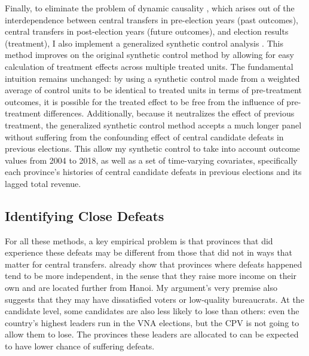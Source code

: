 \documentclass[12pt]{article}
\newcommand{\1}{\mathbbm{1}}
\begin{document}
Finally, to eliminate the problem of dynamic causality \citep{ImaiKim2019}, which arises out of the interdependence between central transfers in pre-election years (past outcomes), central transfers in post-election years (future outcomes), and election results (treatment), I also implement a generalized synthetic control analysis \citep{Xu2017gsynth}. This method improves on the original synthetic control method \citep{Abadie2010} by allowing for easy calculation of treatment effects across multiple treated units. The fundamental intuition remains unchanged: by using a synthetic control made from a weighted average of control units to be identical to treated units in terms of pre-treatment outcomes, it is possible for the treated effect to be free from the influence of pre-treatment differences. Additionally, because it neutralizes the effect of previous treatment, the generalized synthetic control method accepts a much longer panel without suffering from the confounding effect of central candidate defeats in previous elections. This allow my synthetic control to take into account outcome values from 2004 to 2018, as well as a set of time-varying covariates, specifically each province's histories of central candidate defeats in previous elections and its lagged total revenue.

\subsection{Identifying Close Defeats}
\label{sec:methods_sample}

For all these methods, a key empirical problem is that provinces that did experience these defeats may be different from those that did not in ways that matter for central transfers. \citet{MaleskySchuler2011} already show that provinces where defeats happened tend to be more independent, in the sense that they raise more income on their own and are located further from Hanoi. My argument's very premise also suggests that they may have dissatisfied voters or low-quality bureaucrats. At the candidate level, some candidates are also less likely to lose than others: even the country's highest leaders run in the VNA elections, but the CPV is not going to allow them to lose. The provinces these leaders are allocated to can be expected to have lower chance of suffering defeats. 
\end{document}
